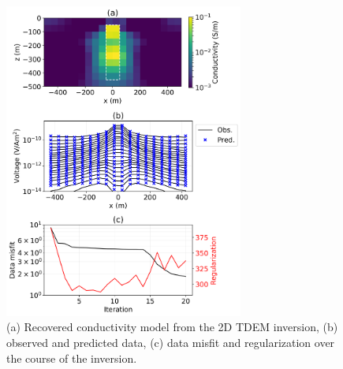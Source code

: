 \documentclass[paper]{geophysics}
\begin{document}
\begin{figure}[!htb]
  \centering
  \includegraphics[width=0.7\textwidth]{figures/2Dvoxel_inversion.png}
  \caption{(a) Recovered conductivity model from the 2D TDEM inversion, (b) observed and predicted data, (c) data misfit and regularization over the course of the inversion.}
  \label{fig:2Dvoxel_inversion}
\end{figure}
\end{document}
